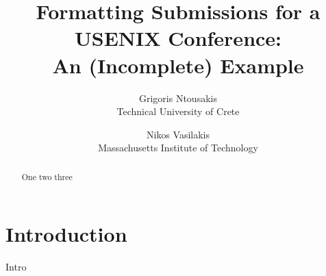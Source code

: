 \documentclass[letterpaper,twocolumn,10pt]{article}
\begin{document}

\date{}

\title{\Large \bf Formatting Submissions for a USENIX Conference:\\
  An (Incomplete) Example}

\author{
{\rm Grigoris Ntousakis}\\
Technical University of Crete
\and
{\rm Nikos Vasilakis}\\
Massachusetts Institute of Technology
}

\maketitle

\begin{abstract}
  One two three
\end{abstract}

\section{Introduction}

Intro


% 



\end{document}
